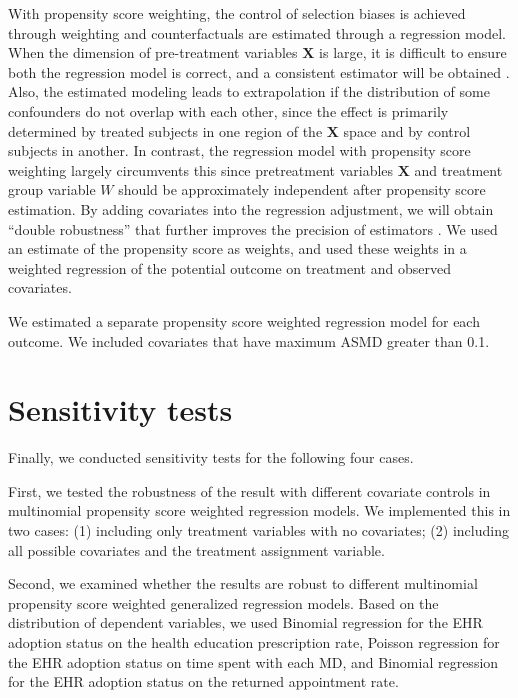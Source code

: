 \documentclass[12pt]{report}
\begin{document}
With propensity score weighting, the control of selection biases is achieved through weighting and counterfactuals are estimated through a regression model. When the dimension of pre-treatment variables $\textbf{X}$ is large, it is difficult to ensure both the regression model is correct, and a consistent estimator will be obtained \citep{rubin1997estimating}. Also, the estimated modeling leads to extrapolation if the distribution of some confounders do not overlap with each other, since the effect is primarily determined by treated subjects in one region of the $\textbf{X}$ space and by control subjects in another. In contrast, the regression model with propensity score weighting largely circumvents this since pretreatment variables $\textbf{X}$ and treatment group variable $W$ should be approximately independent after propensity score estimation. By adding covariates into the regression adjustment, we will obtain ``double robustness'' that further improves the precision of estimators \citep{lunceford2004stratification}. We used an estimate of the propensity score as weights, and used these weights in a weighted regression of the potential outcome on treatment and observed covariates.

We estimated a separate propensity score weighted regression model for each outcome. We included covariates that have maximum ASMD greater than 0.1. 

\section{Sensitivity tests}

Finally, we conducted sensitivity tests for the following four cases.

First, we tested the robustness of the result with different covariate controls in multinomial propensity score weighted regression models. We implemented this in two cases: (1) including only treatment variables with no covariates; (2) including all possible covariates and the treatment assignment variable.

Second, we examined whether the results are robust to different multinomial propensity score weighted generalized regression models. Based on the distribution of dependent variables, we used Binomial regression for the EHR adoption status on the health education prescription rate, Poisson regression for the EHR adoption status on time spent with each MD, and Binomial regression for the EHR adoption status on the returned appointment rate.
\end{document}
